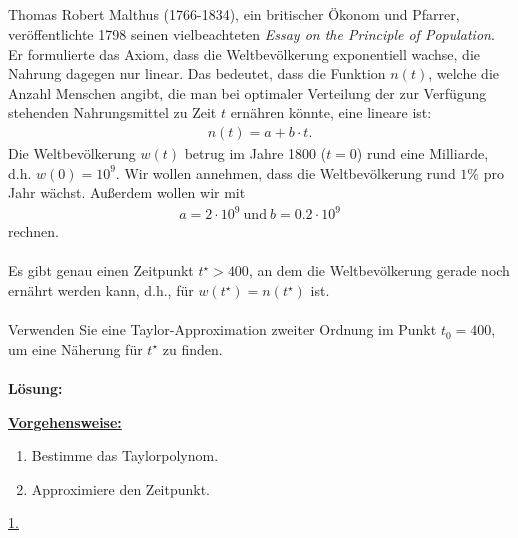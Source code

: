 \subsection*{}
Thomas Robert Malthus (1766-1834), ein britischer Ökonom und Pfarrer, veröffentlichte
1798 seinen vielbeachteten \textit{Essay on the Principle of Population}.
Er formulierte das Axiom, dass die Weltbevölkerung exponentiell wachse, die Nahrung dagegen nur linear. 
Das bedeutet, dass die Funktion $ n(t) $, welche die Anzahl Menschen angibt, die man bei optimaler Verteilung der zur Verfügung stehenden Nahrungsmittel zu Zeit $ t $ ernähren könnte, eine lineare ist:
\begin{align*}
	n(t) = a + b \cdot t.
\end{align*}
Die Weltbevölkerung $ w(t) $ betrug im Jahre 1800 ($ t= 0 $) rund eine Milliarde, d.h. $ w(0) = 10^9 $.
Wir wollen annehmen, dass die Weltbevölkerung rund $ 1\% $ pro Jahr wächst.
Außerdem wollen wir mit
\begin{align*}
	a = 2 \cdot 10^9 \ \textrm{und} \ b = 0.2 \cdot 10^9
\end{align*}
rechnen.\\
\\
Es gibt genau einen Zeitpunkt $ t^\star > 400 $, an dem die Weltbevölkerung gerade noch ernährt werden kann, d.h., für $ w(t^\star)  = n(t^\star )$ ist.\\
\\
Verwenden Sie eine Taylor-Approximation zweiter Ordnung im Punkt $ t_0 = 400 $, um eine Näherung für $ t^\star $ zu finden.
\\ \\
\textbf{Lösung:}
\begin{mdframed}
\underline{\textbf{Vorgehensweise:}}
\renewcommand{\labelenumi}{\theenumi.}
\begin{enumerate}
\item Bestimme das Taylorpolynom. 
\item Approximiere den Zeitpunkt.
\end{enumerate}
\end{mdframed}

\underline{1. }\\


\newpage
